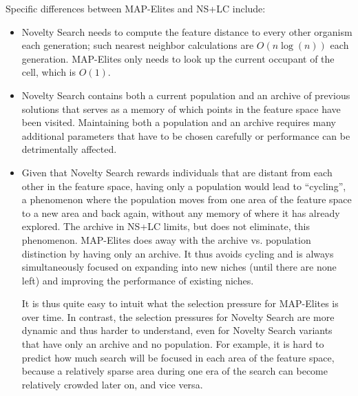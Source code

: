 \documentclass[twocolumn, DIV25, 9pt]{scrartcl}
\begin{document}
Specific differences between MAP-Elites and NS+LC include:
\begin{itemize}

\item Novelty Search needs to compute the feature distance to every other organism each generation; such nearest neighbor calculations are $O(n \operatorname{log}(n))$\cite{friedman1977algorithm} each generation. MAP-Elites only needs to look up the current occupant of the cell, which is $O(1)$.


\item Novelty Search contains both a current population and an archive of previous solutions that serves as a memory of which points in the feature space have been visited. Maintaining both a population and an archive requires many additional parameters that have to be chosen carefully or performance can be detrimentally affected\cite{gomes2015devising}.

\item Given that Novelty Search rewards individuals that are distant from each other in the feature space, having only a population would lead to ``cycling'', a phenomenon where the population moves from one area of the feature space to a new area and back again, without any memory of where it has already explored. The archive in NS+LC limits, but does not eliminate, this phenomenon. MAP-Elites does away with the archive vs. population distinction by having only an archive. It thus avoids cycling and is always simultaneously focused on expanding into new niches (until there are none left) and improving the performance of existing niches. 

It is thus quite easy to intuit what the selection pressure for MAP-Elites is over time. In contrast, the selection pressures for Novelty Search are more dynamic and thus harder to understand, even for Novelty Search variants that have only an archive and no population\cite{gomes2015devising}. For example, it is hard to predict how much search will be focused in each area of the feature space, because a relatively sparse area during one era of the search can become relatively crowded later on, and vice versa. 


\end{itemize}
\end{document}
